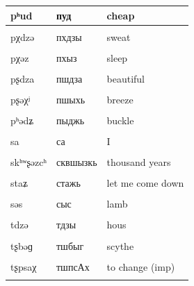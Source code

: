 \documentclass[
]{article}
\begin{document}
\begin{longtable}{l|l|l}
\hline
pʰud & пуд & cheap\\
\hline
\cellcolor{gray!6}{pχa} & \cellcolor{gray!6}{пха} & \cellcolor{gray!6}{heat}\\
\hline
pχdzə & пхдзы & sweat\\
\hline
\cellcolor{gray!6}{pχtə} & \cellcolor{gray!6}{пхты} & \cellcolor{gray!6}{scab}\\
\hline
pχəz & пхыз & sleep\\
\hline
\cellcolor{gray!6}{pʂa} & \cellcolor{gray!6}{пша} & \cellcolor{gray!6}{wind}\\
\hline
pʂdza & пшдза & beautiful\\
\hline
\cellcolor{gray!6}{pʂkʰa} & \cellcolor{gray!6}{пшка} & \cellcolor{gray!6}{soft}\\
\hline
pʂəχʲ & пшыхь & breeze\\
\hline
\cellcolor{gray!6}{pɕba} & \cellcolor{gray!6}{пщба} & \cellcolor{gray!6}{four}\\
\hline
pʰədʑ & пыджь & buckle\\
\hline
\cellcolor{gray!6}{pʰəts} & \cellcolor{gray!6}{пыц} & \cellcolor{gray!6}{tooth}\\
\hline
sa & са & I\\
\hline
\cellcolor{gray!6}{skʰʷʂə} & \cellcolor{gray!6}{сквшы} & \cellcolor{gray!6}{year}\\
\hline
skʰʷʂəzcʰ & сквшызкь & thousand years\\
\hline
\cellcolor{gray!6}{ssa} & \cellcolor{gray!6}{сса} & \cellcolor{gray!6}{small}\\
\hline
staʑ & стажь & let me come down\\
\hline
\cellcolor{gray!6}{sə} & \cellcolor{gray!6}{сы} & \cellcolor{gray!6}{snow}\\
\hline
səs & сыс & lamb\\
\hline
\cellcolor{gray!6}{tc’i} & \cellcolor{gray!6}{ткIьи} & \cellcolor{gray!6}{strict}\\
\hline
tdzə & тдзы & hous\\
\hline
\cellcolor{gray!6}{tʰopʰ} & \cellcolor{gray!6}{топ} & \cellcolor{gray!6}{ball}\\
\hline
tʂbəɡ & тшбыг & scythe\\
\hline
\cellcolor{gray!6}{tʂʑɪ} & \cellcolor{gray!6}{тшжьы} & \cellcolor{gray!6}{horse meat}\\
\hline
tʂpsaχ & тшпсАх & to change (imp)\\
\hline
\cellcolor{gray!6}{tʂpɕæ} & \cellcolor{gray!6}{тшпщА} & \cellcolor{gray!6}{to rest (imp)}\\

\end{longtable}
\end{document}
